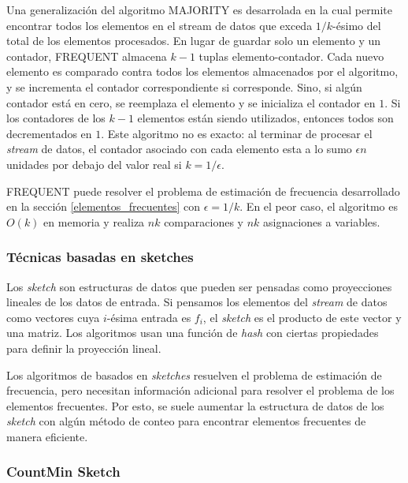 \documentclass[a4paper,10pt, oneside]{article}
\begin{document}
Una generalización del algoritmo MAJORITY es desarrolada en \cite{Karp:2003:SAF:762471.762473} la cual permite encontrar todos los elementos en el stream de datos que exceda $1/k$-ésimo del total de los elementos procesados. En lugar de guardar solo un elemento y un contador, FREQUENT almacena $k-1$ tuplas elemento-contador. Cada nuevo elemento es comparado contra todos los elementos almacenados por el algoritmo, y se incrementa el contador correspondiente si corresponde. Sino, si algún contador está en cero, se reemplaza el elemento y se inicializa el contador en $1$. Si los contadores de los $k-1$ elementos están siendo utilizados, entonces todos son decrementados en $1$. Este algoritmo no es exacto: al terminar de procesar el \textit{stream} de datos, el contador asociado con cada elemento esta a lo sumo $\epsilon n$ unidades por debajo del valor real si $k = 1/ \epsilon$.\cite{Kranakis03boundsfor}

FREQUENT puede resolver el problema de estimación de frecuencia desarrollado en la sección \ref{elementos_frecuentes} con $\epsilon = 1/k$. En el peor caso, el algoritmo es $O(k)$ en memoria y realiza $nk$ comparaciones y $nk$ asignaciones a variables.

\subsubsection{Técnicas basadas en sketches}

Los \textit{sketch} son estructuras de datos que pueden ser pensadas como proyecciones lineales de los datos de entrada. Si pensamos los elementos del \textit{stream} de datos como vectores cuya $i$-ésima entrada es $f_i$, el \textit{sketch} es el producto de este vector y una matriz. Los algoritmos usan una función de \textit{hash} con ciertas propiedades para definir la proyección lineal.

Los algoritmos de basados en \textit{sketches} resuelven el problema de estimación de frecuencia, pero necesitan información adicional para resolver el problema de los elementos frecuentes. Por esto, se suele aumentar la estructura de datos de los \textit{sketch} con algún método de conteo para encontrar elementos frecuentes de manera eficiente.

\subsubsection*{CountMin Sketch}
\end{document}
